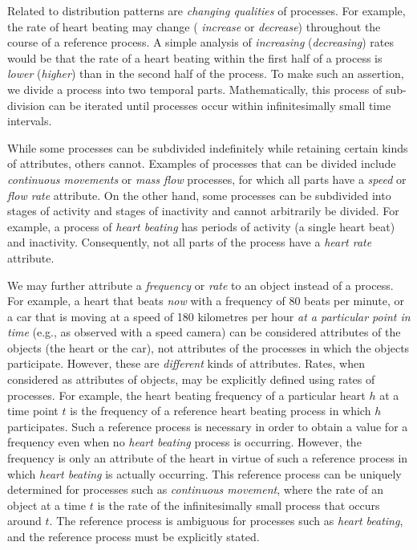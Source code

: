 \documentclass{bioinfo}
\begin{document}
Related to distribution patterns are {\em changing qualities} of
processes. For example, the rate of heart beating may change ({\em
  increase} or {\em decrease}) throughout the course of a reference
process. A simple analysis of {\em increasing} ({\em decreasing})
rates would be that the rate of a heart beating within the first half
of a process is {\em lower} ({\em higher}) than in the second half of
the process. To make such an assertion, we divide a process into two
temporal parts. Mathematically, this process of sub-division can be
iterated until processes occur within infinitesimally small time
intervals.

While some processes can be subdivided indefinitely while retaining
certain kinds of attributes, others cannot.
Examples of processes that can be divided include {\em continuous
  movements} or {\em mass flow} processes, for which all parts have a
{\em speed} or {\em flow rate} attribute. On the other hand, some
processes can be subdivided into stages of activity and stages of
inactivity and cannot arbitrarily be divided. For example, a process
of {\em heart beating} has periods of activity (a single heart beat)
and inactivity. Consequently, not all parts of the process have a {\em
  heart rate} attribute.

We may further attribute a {\em frequency} or {\em rate} to an object
instead of a process. For example, a heart that beats {\em now} with a
frequency of 80 beats per minute, or a car that is moving at a speed
of 180 kilometres per hour {\em at a particular point in time} (e.g.,
as observed with a speed camera) can be considered attributes of the
objects (the heart or the car), not attributes of the processes in
which the objects participate. However, these are {\em different}
kinds of attributes. Rates, when considered as attributes of objects,
may be explicitly defined using rates of processes. For example, the
heart beating frequency of a particular heart $h$ at a time point $t$
is the frequency of a reference heart beating process in which $h$
participates. Such a reference process is necessary in order to obtain
a value for a frequency even when no {\em heart beating} process is
occurring. However, the frequency is only an attribute of the heart in
virtue of such a reference process in which {\em heart beating} is
actually occurring.  This reference process can be uniquely determined
for processes such as {\em continuous movement}, where the rate of an
object at a time $t$ is the rate of the infinitesimally small process
that occurs around $t$. The reference process is ambiguous for
processes such as {\em heart beating}, and the reference process must
be explicitly stated.
\end{document}
